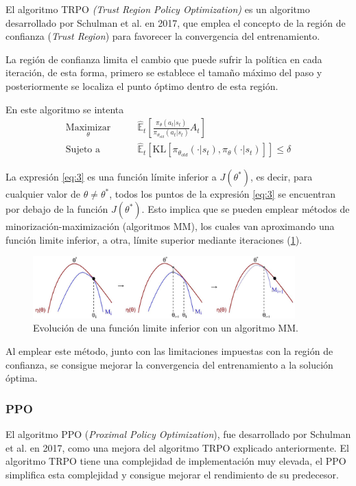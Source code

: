 El algoritmo TRPO \textit{(Trust Region Policy Optimization)} es un algoritmo desarrollado por Schulman et al. \cite{schulman2017proximal} en 2017, que emplea el concepto de la región de confianza (\textit{Trust Region}) para favorecer la convergencia del entrenamiento.

La región de confianza limita el cambio que puede sufrir la política en cada iteración, de esta forma, primero se establece el tamaño máximo del paso y posteriormente se localiza el punto óptimo dentro de esta región.

En este algoritmo se intenta
\begin{align}\label{eq:3}
	\underset{\theta}{\text{Maximizar}}\qquad&{\mathbb{\hat E}_t} \left[ \frac{\pi_\theta (a_t|s_t)}{\pi_{\theta_{old}} (a_t|s_t)} \hat{A}_t\right]\\\label{eq:4}
	\text{Sujeto a}\qquad& {\mathbb{\hat E}_t} \left[ \text{KL}[\pi_{\theta_{old}}(\cdot|s_t),\pi_{\theta}(\cdot|s_t)]\right] \le \delta
\end{align}

La expresión \ref{eq:3} es una función límite inferior a $J(\theta^*)$, es decir, para cualquier valor de $\theta \neq \theta^*$, todos los puntos de la expresión \ref{eq:3} se encuentran por debajo de la función $J(\theta^*)$. Esto implica que se pueden emplear métodos de minorización-maximización (algoritmos MM), los cuales van aproximando una función limite inferior, a otra, límite superior mediante iteraciones (\cref{MM_fig}).

\begin{figure}[htb!]
	\centering
	\includegraphics[width=0.9\textwidth]{background/MM}
	\caption{Evolución de una función limite inferior con un algoritmo MM.}
	\label{MM_fig}
\end{figure}

Al emplear este método, junto con las limitaciones impuestas con la región de confianza, se consigue mejorar la convergencia del entrenamiento a la solución óptima.

\subsubsection{PPO}
El algoritmo PPO (\textit{Proximal Policy Optimization}), fue desarrollado por Schulman et al. \cite{schulman2017proximal} en 2017, como una mejora del algoritmo TRPO explicado anteriormente. El algoritmo TRPO tiene una complejidad de implementación muy elevada, el PPO simplifica esta complejidad y consigue mejorar el rendimiento de su predecesor.

